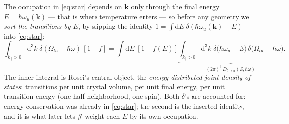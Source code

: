 \documentclass[11pt,a4paper]{article}
\numberwithin{equation}{section}
\newcommand{\hw}{\hbar\omega}
\newcommand{\cJ}{\mathcal{J}}
\newcommand{\kpar}{k_{\parallel}}
\newcommand{\dd}{\mathrm{d}}
\newcommand{\Dlu}{D_{l\to u}}
\newcommand{\fFD}{f}
\begin{document}
The occupation in \eqref{eq:star} depends on $\mathbf k$ only through
the final energy $E=\hbar\omega_u(\mathbf k)$ --- that is where
temperature enters --- so before any geometry we \emph{sort the
transitions by $E$}, by slipping the identity
$1=\int\dd E\;\delta(\hbar\omega_u(\mathbf k)-E)$ into \eqref{eq:star}:
\begin{equation}
\int_{\kpar>0}\!\!\dd^3k\;\delta(\Omega_{lu}-\hw)\,[1-\fFD]
=\int\!\dd E\;[1-\fFD(E)]
\underbrace{\int_{\kpar>0}\!\!\dd^3k\;
\delta\bigl(\hbar\omega_u-E\bigr)\,
\delta\bigl(\Omega_{lu}-\hw\bigr)}_{(2\pi)^3\,\Dlu(E,\hw)} .
\label{eq:sort}
\end{equation}
The inner integral is Rosei's central object, the
\emph{energy-distributed joint density of states}: transitions per
unit crystal volume, per unit final energy, per unit transition energy
(one half-neighborhood, one spin).  Both $\delta$'s are accounted for:
energy conservation was already in \eqref{eq:star}; the second is the
inserted identity, and it is what later lets $\cJ$ weight each $E$ by
its own occupation.
\end{document}
